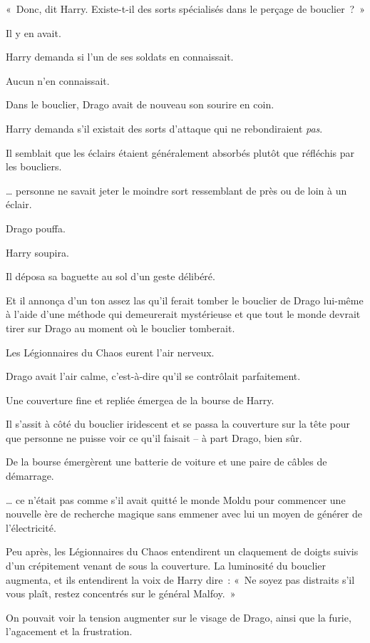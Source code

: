 {«~Donc, dit Harry.
Existe-t-il des sorts spécialisés dans le perçage de bouclier~?~»

Il y en avait.

Harry demanda si l'un de ses soldats en connaissait.

Aucun n'en connaissait.

Dans le bouclier, Drago avait de nouveau son sourire en coin.

Harry demanda s'il existait des sorts d'attaque qui ne rebondiraient \emph{pas}.

Il semblait que les éclairs étaient généralement absorbés plutôt que réfléchis par les boucliers.

… personne ne savait jeter le moindre sort ressemblant de près ou de loin à un éclair.

Drago pouffa.

Harry soupira.

Il déposa sa baguette au sol d'un geste délibéré.

Et il annonça d'un ton assez las qu'il ferait tomber le bouclier de Drago lui-même à l'aide d'une méthode qui demeurerait mystérieuse et que tout le monde devrait tirer sur Drago au moment où le bouclier tomberait.

Les Légionnaires du Chaos eurent l'air nerveux.

Drago avait l'air calme, c'est-à-dire qu'il se contrôlait parfaitement.

Une couverture fine et repliée émergea de la bourse de Harry.

Il s'assit à côté du bouclier iridescent et se passa la couverture sur la tête pour que personne ne puisse voir ce qu'il faisait -- à part Drago, bien sûr.

De la bourse émergèrent une batterie de voiture et une paire de câbles de démarrage.

… ce n'était pas comme s'il avait quitté le monde Moldu pour commencer une nouvelle ère de recherche magique sans emmener avec lui un moyen de générer de l'électricité.

Peu après, les Légionnaires du Chaos entendirent un claquement de doigts suivis d'un crépitement venant de sous la couverture.
La luminosité du bouclier augmenta, et ils entendirent la voix de Harry dire~: «~Ne soyez pas distraits s'il vous plaît, restez concentrés sur le général Malfoy.~»

On pouvait voir la tension augmenter sur le visage de Drago, ainsi que la furie, l'agacement et la frustration.

}

